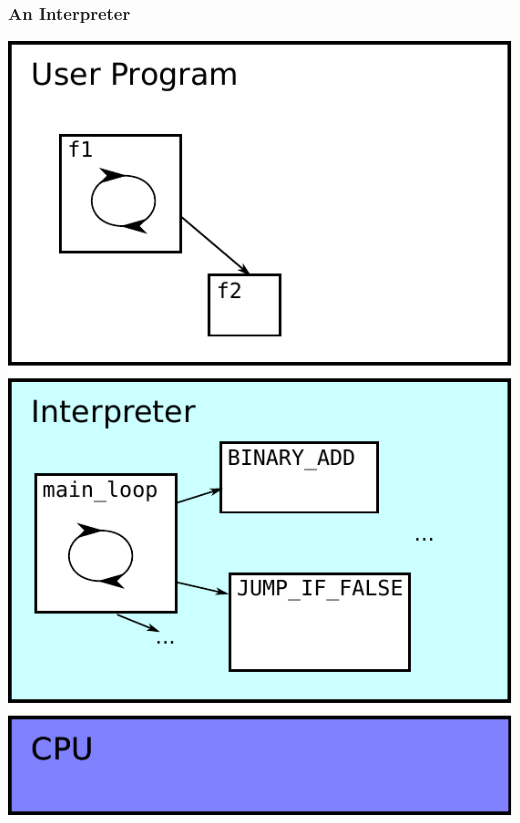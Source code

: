 \documentclass[utf8x]{beamer}
\begin{document}
\begin{frame}
  \frametitle{An Interpreter}
  \includegraphics[scale=0.5]{figures/trace01.pdf}
\end{frame}
\end{document}
